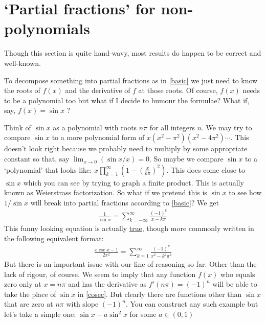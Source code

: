 \documentclass{article}
\begin{document}
\section*{`Partial fractions' for non-polynomials}

\begin{tcolorbox}
Though this section is quite hand-wavy, most results do happen to be correct and well-known.
\end{tcolorbox}

To decompose something into partial fractions as in \eqref{basic} we just need to know the roots of $f(x)$ and the derivative of $f$ at those roots. Of course, $f(x)$ needs to be a polynomial too but what if I decide to humour the formulae? What if, say, $f(x) = \sin x$ ?

Think of $\sin x$ as a polynomial with roots $n\pi$ for all integers $n$. We may try to compare $\sin x$ to a more polynomial form of $x(x^2-\pi^2)(x^2-4\pi^2)\cdots$. This doesn't look right because we probably need to multiply by some appropriate constant so that, say $\lim_{x\rightarrow 0} (\sin x / x) = 0$. So maybe we compare $\sin x$ to a `polynomial' that looks like: $x \prod_{k=1}^{\infty} \left(1-\left(\frac{x}{k\pi}\right)^2\right)$. This does come close to $\sin x$ which you can see by trying to graph a finite product. This is actually known as Weierstrass factorization. So what if we pretend this is $\sin x$ to see how $1/\sin x$ will break into partial fractions according to \eqref{basic}? We get
\begin{align}
    \frac{1}{\sin x} = \sum_{k = -\infty}^{\infty} \frac{(-1)^k}{x-k\pi} \label{cosec}
\end{align}
This funny looking equation is actually \href{https://en.wikipedia.org/wiki/Trigonometric_functions#Partial_fraction_expansion}{true}, though more commonly written in the following equivalent format:
\begin{align}
     \frac{x\csc x - 1}{2x^2} = \sum_{k=1}^{\infty} \frac{(-1)^k }{x^2-k^2\pi^2}
\end{align}
But there is an important issue with our line of reasoning so far. Other than the lack of rigour, of course. We seem to imply that any function $f(x)$ who equals zero only at $x = n\pi$ and has the derivative as $f'(n\pi) = (-1)^n$ will be able to take the place of $\sin x$ in \eqref{cosec}. But clearly there are functions other than $\sin x$ that are zero at $n\pi$ with slope $(-1)^n$. You can construct any such example but let's take a simple one: $\sin x - a \sin^2 x$ for some $a\in (0,1)$ 
\end{document}
